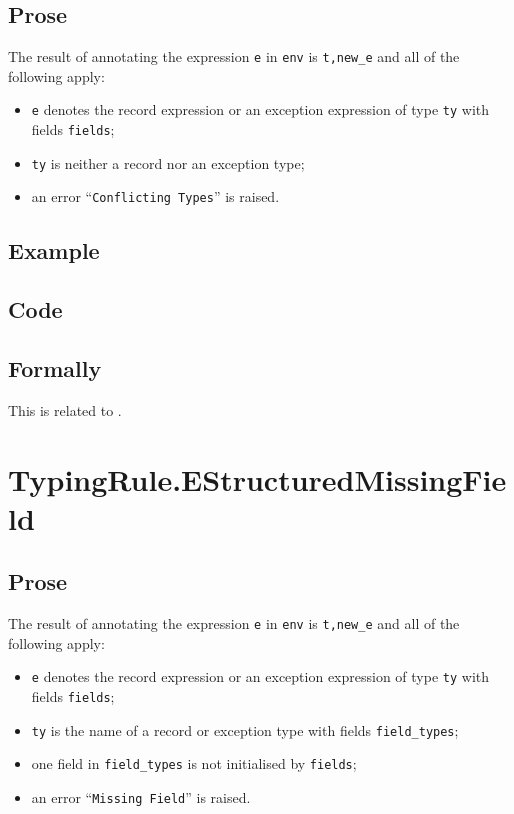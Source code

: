 \documentclass{book}
\begin{document}
  \subsection{Prose}
  The result of annotating the expression \texttt{e} in \texttt{env} is
\texttt{t,new\_e} and all of the following apply:
  \begin{itemize}
  \item \texttt{e} denotes the record expression or an exception expression of type \texttt{ty} with fields \texttt{fields};
  \item \texttt{ty} is neither a record nor an exception type;
  \item an error ``\texttt{Conflicting Types}'' is raised.
  \end{itemize}

  \subsection{Example}

  \subsection{Code}

\begin{emptyformal}
    \subsection{Formally}
\end{emptyformal}


  This is related to .

\section{TypingRule.EStructuredMissingField \label{sec:TypingRule.EStructuredMissingField}}

  \subsection{Prose}
  The result of annotating the expression \texttt{e} in \texttt{env} is
\texttt{t,new\_e} and all of the following apply:
  \begin{itemize}
  \item \texttt{e} denotes the record expression or an exception expression of type \texttt{ty} with fields \texttt{fields};
  \item \texttt{ty} is the name of a record or exception type with fields \texttt{field\_types};
  \item one field in \texttt{field\_types} is not initialised by \texttt{fields};
  \item an error ``\texttt{Missing Field}'' is raised.
  \end{itemize}
\end{document}
